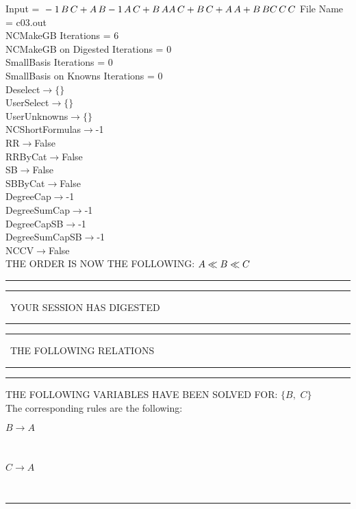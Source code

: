 \documentclass[rep10,leqno]{report}
\begin{document}
\normalsize
\baselineskip=12pt
\noindent
Input = 
$
\\-1\,
 B\,
 C + A\,
 B\\
-1\,
 A\,
 C + B\,
 A\\
A\,
 C + B\,
 C + A\,
 A + B\,
 B\\
C\,
 C\,
 C\\
$
File Name = c03.out\\
NCMakeGB Iterations = 6\\
NCMakeGB on Digested Iterations = 0\\
SmallBasis Iterations = 0\\
SmallBasis on Knowns Iterations = 0\\
Deselect$\rightarrow \{\}$\\
UserSelect$\rightarrow \{\}$\\
UserUnknowns$\rightarrow \{\}$\\
NCShortFormulas$\rightarrow$-1\\
RR$\rightarrow $False\\
RRByCat$\rightarrow $False\\
SB$\rightarrow $False\\
SBByCat$\rightarrow $False\\
DegreeCap$\rightarrow $-1\\
DegreeSumCap$\rightarrow $-1\\
DegreeCapSB$\rightarrow $-1\\
DegreeSumCapSB$\rightarrow $-1\\
NCCV$\rightarrow $False\\
THE ORDER IS NOW THE FOLLOWING:\hfil\break
$
A\ll
B\ll
C\\
$
\rule[2pt]{6in}{4pt}\hfil\break
\rule[2pt]{1.879in}{4pt}
\ YOUR SESSION HAS DIGESTED\ 
\rule[2pt]{1.879in}{4pt}\hfil\break
\rule[2pt]{1.923in}{4pt}
\ THE FOLLOWING RELATIONS\ 
\rule[2pt]{1.923in}{4pt}\hfil\break
\rule[2pt]{6in}{4pt}\hfil\break
THE FOLLOWING VARIABLES HAVE BEEN SOLVED FOR:\hfil\break
$\{B,
$ $
C\}$
\smallskip\\
The corresponding rules are the following:\smallskip\\
\begin{minipage}{6in}
$
B\rightarrow A
$
\end{minipage}\medskip\\
\begin{minipage}{6in}
$
C\rightarrow A
$
\end{minipage}\medskip\\
\rule[3pt]{6in}{.7pt}\\
\end{document}
